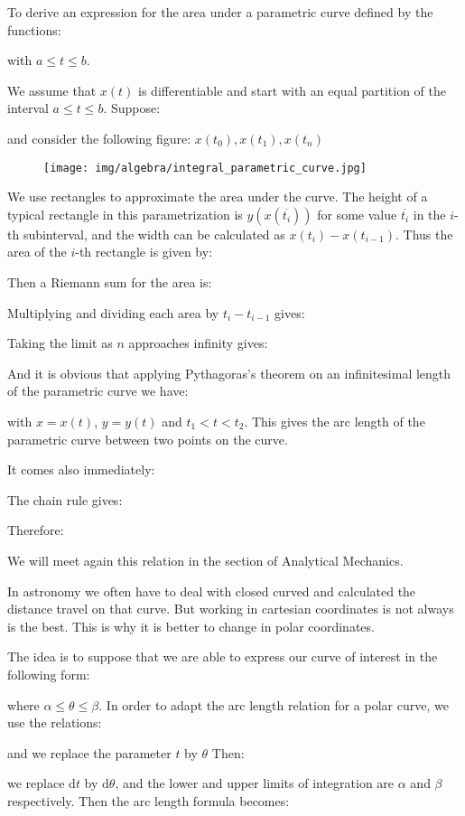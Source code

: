 	To derive an expression for the area under a parametric curve defined by the functions:
	
	with $a\leq t\leq b$.

	We assume that $x(t)$ is differentiable and start with an equal partition of the interval $a\leq t\leq b$. Suppose:
	
	and consider the following figure: $x(t_0),x(t_1),x(t_n)$
	\begin{figure}[H]
		\centering
		\texttt{[image: img/algebra/integral\_parametric\_curve.jpg]}
	\end{figure}
	We use rectangles to approximate the area under the curve. The height of a typical rectangle in this parametrization is $y(x(\overline{t_i}))$ for some value $\overline{t_i}$ in the $i$-th subinterval, and the width can be calculated as $x(t_i)-x(t_{i-1})$. Thus the area of the $i$-th rectangle is given by:
	
	Then a Riemann sum for the area is:
	
	Multiplying and dividing each area by $t_i-t_{i-1}$ gives:
	
	Taking the limit as $n$ approaches infinity gives:
	
	And it is obvious that applying Pythagoras's theorem on an infinitesimal length of the parametric curve we have:
	
	with $x=x(t)$, $y=y(t)$ and $t_1<t<t_2$. This gives the arc length of the parametric curve between two points on the curve.
	
	It comes also immediately:
	
	The chain rule gives:
	
	Therefore:
	
	We will meet again this relation in the section of Analytical Mechanics.
	
	In astronomy we often have to deal with closed curved and calculated the distance travel on that curve. But working in cartesian coordinates is not always is the best. This is why it is better to change in polar coordinates.

	The idea is to suppose that we are able to express our curve of interest in the following form:
	
	where $\alpha\leq \theta \leq \beta$. In order to adapt the arc length relation for a polar curve, we use the relations:
	
	and we replace the parameter $t$ by $\theta$ Then:
	
	we replace $\mathrm{d}t$ by $\mathrm{d}\theta$, and the lower and upper limits of integration are $\alpha$ and $\beta$ respectively. Then the arc length formula becomes:
	

